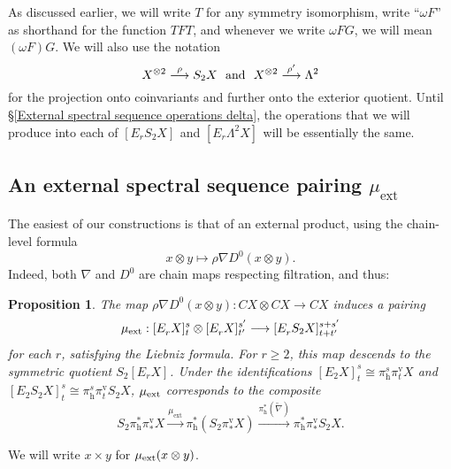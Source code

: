 \documentclass[11pt]{amsart} \renewcommand{\baselinestretch}{1.2}
\theoremstyle{plain}
\newtheorem{prop}[thm]{Proposition}
\numberwithin{equation}{section} %
\theoremstyle{plain}
\newtheorem{prop}[thm]{Proposition}
\numberwithin{equation}{chapter} %
\renewcommand{\to}{\longrightarrow}
\newcommand{\scrC}{\mathscr{C}}
\newcommand{\ExtCohProd}{\mu_\mathrm{ext}}
\newcommand{\twist}{\omega}
\newcommand{\Nabla}{\nabla}
\newcommand{\algs}{{\scrC\!\textit{\normalfont\textit{om}}}}
\newcommand{\E}[5]{[E^{#1}_{#2}#3]^{#4}_{#5}}
\newcommand{\Edownup}[5]{[E_{#1}^{#2}#3]^{#4}_{#5}}
\newcommand{\uver}{^\mathrm{v}}
\newcommand{\dhor}{_\mathrm{h}}
\renewcommand{\mapsto}{\longmapsto}
\newcommand{\SubsectionOrSection}[1]{\subsection{#1}}
\begin{document}
\begin{second quadrant homotopy sseq operations}
As discussed earlier, we will write $T$ for any symmetry isomorphism, write ``$\twist F$'' as shorthand for the function $TFT$, and  whenever we write $\twist FG$, we will mean $(\twist F)G$. We will also use the notation
\[X^{\otimes2}\overset{\rho}{\to}S_2X\textup{\ \ and\ \ }X^{\otimes2}\overset{\rho'}{\to}\Lambda^2
\]
for the projection onto coinvariants and further onto the exterior quotient. Until \S\ref{External spectral sequence operations delta}, the operations that we will produce into each of $\Edownup{r}{}{S_2X}{}{}$ and $\Edownup{r}{}{\Lambda^2X}{}{}$ will be essentially the same.
\SubsectionOrSection{An external spectral sequence pairing $\mu_\mathrm{ext}$}
The easiest of our constructions is that of an external product, using 
the chain-level formula
\[x\otimes y\mapsto\rho\Nabla D^0(x\otimes y).\]
Indeed, both $\Nabla$ and $D^0$ are chain maps respecting filtration, and thus:
\begin{prop}
\label{prop on basic product}
The map $\rho\Nabla D^0(x\otimes y):CX\otimes CX\to CX$ induces a pairing
\[\mu_\textup{ext}:\Edownup{r}{}{X}{s}{t}\otimes \Edownup{r}{}{X}{s'}{t'}\to \Edownup{r}{}{S_2X}{s+s'}{t+t'}\]
for each $r$, satisfying the Liebniz formula. For $r\geq2$, this map descends to the symmetric quotient $S_2\Edownup{r}{}{X}{}{}$. Under the identifications $\Edownup{2}{}{X}{s}{t}\cong \pi\dhor^s\pi\uver_t X$ and $\Edownup{2}{}{S_2X}{s}{t}\cong \pi\dhor^s\pi\uver_t S_2X$, $\mu_\textup{ext}$ corresponds to the composite
\[S_2\pi\dhor^*\pi\uver_* X
\overset{\ExtCohProd}{\to} 
\pi\dhor^*(S_2\pi\uver_* X)
\overset{\pi\dhor^{*}(\widetilde{\nabla})}{\to}
\pi\dhor^{*}\pi\uver_{*}S_2 X.\]
\end{prop}
\noindent We will write $x\times y$ for $\mu_\textup{ext}(x\otimes y)$.
%

\end{second quadrant homotopy sseq operations}
\end{document}
